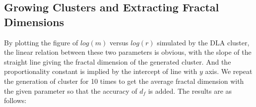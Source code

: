 \documentclass[12pt]{article}
\begin{document}
\subsection{Growing Clusters and Extracting Fractal Dimensions}
\label{sec:clustersandfractals}


By plotting the figure of $log(m)$ versus $log(r)$ simulated by the DLA cluster, the linear relation between these two parameters is obvious, with the slope of the straight line giving the fractal dimension of the generated cluster. And the proportionality constant is implied by the intercept of line with $y$ axis. We repeat the generation of cluster for 10 times to get the average fractal dimension with the given parameter so that the accuracy of $d_f$ is added. The results are as follows:

\end{document}
